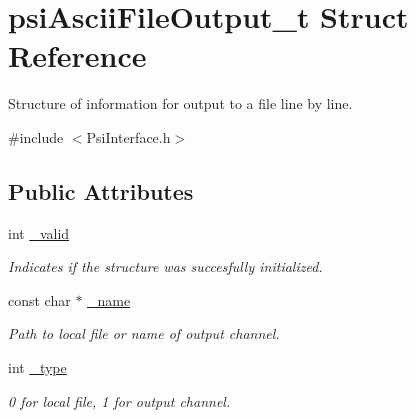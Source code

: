 \hypertarget{structpsiAsciiFileOutput__t}{}\section{psi\+Ascii\+File\+Output\+\_\+t Struct Reference}
\label{structpsiAsciiFileOutput__t}


Structure of information for output to a file line by line.  




{\ttfamily \#include $<$Psi\+Interface.\+h$>$}

\subsection*{Public Attributes}
\begin{DoxyCompactItemize}
\item 
\mbox{\label{structpsiAsciiFileOutput__t_ac51edcdaa6634876c15272f23378396d}} 
int \hyperlink{structpsiAsciiFileOutput__t_ac51edcdaa6634876c15272f23378396d}{\+\_\+valid}
\begin{DoxyCompactList}\small\item\em Indicates if the structure was succesfully initialized. \end{DoxyCompactList}\item 
\mbox{\label{structpsiAsciiFileOutput__t_a01a4cb8af6e9d321b323224b37b598f8}} 
const char $\ast$ \hyperlink{structpsiAsciiFileOutput__t_a01a4cb8af6e9d321b323224b37b598f8}{\+\_\+name}
\begin{DoxyCompactList}\small\item\em Path to local file or name of output channel. \end{DoxyCompactList}\item 
\mbox{\label{structpsiAsciiFileOutput__t_a58ecf3b6fcd296419931dc920d139d72}} 
int \hyperlink{structpsiAsciiFileOutput__t_a58ecf3b6fcd296419931dc920d139d72}{\+\_\+type}
\begin{DoxyCompactList}\small\item\em 0 for local file, 1 for output channel. \end{DoxyCompactList}\item 
\mbox{\label{structpsiAsciiFileOutput__t_aa3182952200aa71ebab66d18e2c7a32a}} 

\end{DoxyCompactItemize}
